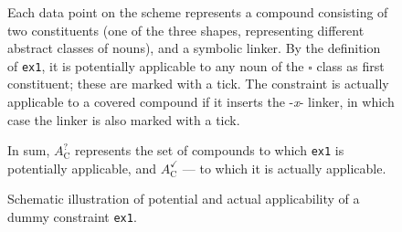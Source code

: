\documentclass[10pt, a4paper]{article}
\begin{document}
\begin{figure}[!ht]
\begin{tcolorbox}












\vspace{-1.8em}

Each data point on the scheme represents a compound consisting of two constituents (one of the three shapes, representing different abstract classes of nouns), and a symbolic linker. By the definition of \texttt{ex1}, it is potentially applicable to any noun of the $\square$ class as first constituent; these are marked with a tick. The constraint is actually applicable to a covered compound if it inserts the -\textit{x}- linker, in which case the linker is also marked with a tick.

In sum, $A^{\bm{?}}_{\mathrm{C}}$ represents the set of compounds to which \texttt{ex1} is potentially applicable, and $A^{\checkmark}_{\mathrm{C}}$ --- to which it is actually applicable.

\end{tcolorbox}

\caption{Schematic illustration of potential and actual applicability of a dummy constraint \texttt{ex1}.}


\label{fig_reg_cov}
\end{figure}
\end{document}

